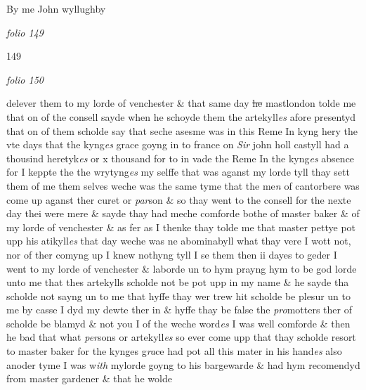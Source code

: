 \documentclass[12pt, a4paper]{book}
\begin{document}
		\ifthenelse{\isodd{\thepage}}
		{\reversemarginpar}
		{\normalmarginpar}
		By me John wyllughby

\dotfill
						\newpage
{}

\textit{folio 149}


\begin{flushright}{\color{Mahogany}149}\end{flushright}

\dotfill
						\newpage
{}

\textit{folio 150}


 	
		\ifthenelse{\isodd{\thepage}}
		{\reversemarginpar}
		{\normalmarginpar}
		delever them to my lorde of venchester \& that same day \sout{he} mastlondon
			 tolde me
 that on of the consell sayde when he schoyde them the artekyll\textit{es} afore
 presentyd that on of them scholde say that seche asesme was in this
 Reme In kyng hery the vte days that the kyng\textit{es} grace goyng in
 to france on \textit{Sir} john holl castyll had a thousind heretyk\textit{es} or x thousand
 for to in vade the Reme In the kyng\textit{es} absence for I keppte the
 the wrytyng\textit{es} my selffe that was aganst my lorde tyll thay sett
 them of me them selves weche was the same tyme that the me\textit{n} of
 		cantorbere was come up aganst ther curet or \textit{par}son \& so thay went to
 the consell for the nexte day thei were mere \& sayde thay had
 meche comforde bothe of master baker \& of my lorde of venchester
 \& as fer as I thenke thay tolde me that master pettye pot upp his
 atikyll\textit{es} that day weche was ne abominabyll what thay vere I
 wott not, nor of ther comyng up I knew nothyng tyll I se them
 then ii dayes to geder I went to my lorde of venchester \& laborde
 un to hym prayng hym to be god lorde unto me that thes artekylls
 scholde not be pot upp in my name \& he sayde tha scholde not
 sayng un to me that hyffe thay wer trew hit scholde be plesur
 un to me by casse I dyd my dewte ther in \& hyffe thay be false
 the \textit{pro}motters ther of scholde be blamyd \& not you I of the weche
 word\textit{es} I was well comforde \& then he bad that what \textit{per}sons or
 artekyll\textit{es} so ever come upp that thay scholde resort to master
 baker for the kynges g\textit{ra}ce had pot all this mater in his hand\textit{es}
 also anoder tyme I was w\textit{ith} mylorde goyng to his bargewarde
 \& had hym recomendyd from master gardener \& that he wolde
\end{document}

